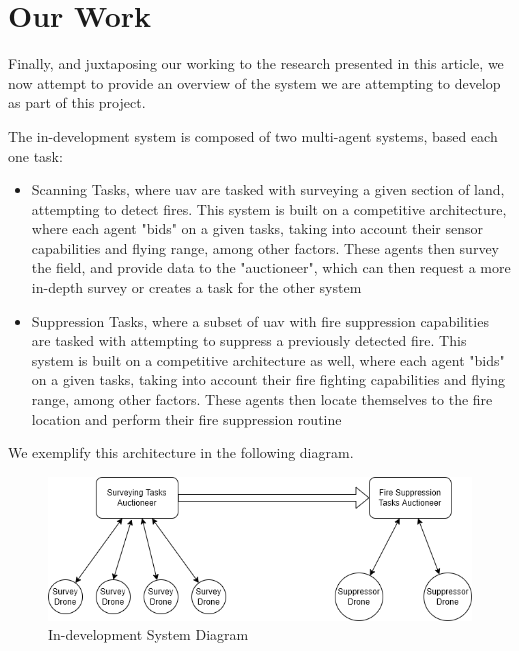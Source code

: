\documentclass[runningheads]{llncs}
\begin{document}
\section{Our Work}

Finally, and juxtaposing our working to the research presented in this article, we now attempt to provide an overview of the system we are attempting to develop as part of this project.

The in-development system is composed of two multi-agent systems, based each one task:

\begin{itemize}
	\item Scanning Tasks, where \acrshort{uav} are tasked with surveying a given section of land, attempting to detect fires. This system is built on a competitive architecture, where each agent "bids" on a given tasks, taking into account their sensor capabilities and flying range, among other factors. These agents then survey the field, and provide data to the "auctioneer", which can then request a more in-depth survey or creates a task for the other system
	\item Suppression Tasks, where a subset of \acrshort{uav} with fire suppression capabilities are tasked with attempting to suppress a previously detected fire. This system is built on a competitive architecture as well, where each agent "bids" on a given tasks, taking into account their fire fighting capabilities and flying range, among other factors. These agents then locate themselves to the fire location and perform their fire suppression routine
\end{itemize}

We exemplify this architecture in the following diagram.

\begin{figure}[htb]
	\centering
	\includegraphics[width=\textwidth]{images/model.png}
	\caption{In-development System Diagram}
	\label{fig:figure1}
\end{figure}



\end{document}
